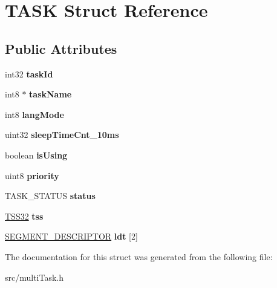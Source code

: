 \hypertarget{struct_t_a_s_k}{}\section{T\+A\+S\+K Struct Reference}
\label{struct_t_a_s_k}
\subsection*{Public Attributes}
\begin{DoxyCompactItemize}
\item 
\hypertarget{struct_t_a_s_k_a8549d848bd43b620507b53a053ed3dd1}{}int32 {\bfseries task\+Id}\label{struct_t_a_s_k_a8549d848bd43b620507b53a053ed3dd1}

\item 
\hypertarget{struct_t_a_s_k_ada14f791c099c9cd12b287af9c48b9d5}{}int8 $\ast$ {\bfseries task\+Name}\label{struct_t_a_s_k_ada14f791c099c9cd12b287af9c48b9d5}

\item 
\hypertarget{struct_t_a_s_k_a3183049eecc90dc3b25e8f2dd1b67585}{}int8 {\bfseries lang\+Mode}\label{struct_t_a_s_k_a3183049eecc90dc3b25e8f2dd1b67585}

\item 
\hypertarget{struct_t_a_s_k_af735ac908f454f95c55bde0b209da2c7}{}uint32 {\bfseries sleep\+Time\+Cnt\+\_\+10ms}\label{struct_t_a_s_k_af735ac908f454f95c55bde0b209da2c7}

\item 
\hypertarget{struct_t_a_s_k_ab77aa0f2cbaf810cf3373563b4e66a68}{}boolean {\bfseries is\+Using}\label{struct_t_a_s_k_ab77aa0f2cbaf810cf3373563b4e66a68}

\item 
\hypertarget{struct_t_a_s_k_a09f8b5430c2234e2ad5c57210942fd8a}{}uint8 {\bfseries priority}\label{struct_t_a_s_k_a09f8b5430c2234e2ad5c57210942fd8a}

\item 
\hypertarget{struct_t_a_s_k_ac0e35f4ce7296b738061037460ca8555}{}T\+A\+S\+K\+\_\+\+S\+T\+A\+T\+U\+S {\bfseries status}\label{struct_t_a_s_k_ac0e35f4ce7296b738061037460ca8555}

\item 
\hypertarget{struct_t_a_s_k_a10dabf492d9c85bef592ba19429d45c4}{}\hyperlink{struct_t_s_s32}{T\+S\+S32} {\bfseries tss}\label{struct_t_a_s_k_a10dabf492d9c85bef592ba19429d45c4}

\item 
\hypertarget{struct_t_a_s_k_aad7dc57517764d71f1c6fc9972b2c113}{}\hyperlink{struct_s_e_g_m_e_n_t___d_e_s_c_r_i_p_t_o_r}{S\+E\+G\+M\+E\+N\+T\+\_\+\+D\+E\+S\+C\+R\+I\+P\+T\+O\+R} {\bfseries ldt} \mbox{[}2\mbox{]}\label{struct_t_a_s_k_aad7dc57517764d71f1c6fc9972b2c113}

\end{DoxyCompactItemize}


The documentation for this struct was generated from the following file\+:\begin{DoxyCompactItemize}
\item 
src/multi\+Task.\+h\end{DoxyCompactItemize}
